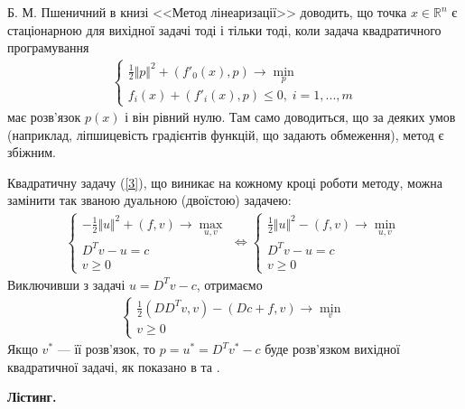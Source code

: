 \documentclass{extreport}
\begin{document}
Б. М. Пшеничний в книзі <<Метод лінеаризації>> \cite{1} доводить, що точка $x\in\mathbb{R}^n$ є стаціонарною для вихідної задачі тоді і тільки тоді, коли
задача квадратичного програмування
\begin{gather}
    \begin{cases}
        \frac{1}{2} \Vert p \Vert^2 + \left(f'_0(x), p\right) \to \underset{p}{\min} \\
        f_i(x) + \left(f'_i(x), p\right) \leq 0, \; i = 1, ..., m
    \end{cases}
\end{gather}
має розв'язок $p(x)$ і він рівний нулю. Там само доводиться, що за деяких умов (наприклад, ліпшицевість градієнтів функцій, що задають обмеження), метод є збіжним.

Квадратичну задачу (\ref{3}), що виникає на кожному кроці роботи методу, можна замінити так званою дуальною (двоїстою) задачею:
\begin{gather}
    \begin{cases}
        -\frac{1}{2} \Vert u \Vert^2 + \left(f, v\right) \to \underset{u, v}{\max} \\
        D^T v - u = c\\
        v \geq 0
    \end{cases} \Leftrightarrow
    \begin{cases}
        \frac{1}{2} \Vert u\Vert^2 - \left(f, v\right) \to \underset{u, v}{\min} \\
        D^T v - u = c \\
        v \geq 0
    \end{cases}
\end{gather}
Виключивши з задачі $u = D^T v - c$, отримаємо
\begin{gather}
    \begin{cases}
        \frac{1}{2}\left(D D^T v, v\right) - \left(D c + f, v \right) \to \underset{v}{\min} \\
        v \geq 0
    \end{cases}
\end{gather}
Якщо $v^*$ --- її розв'язок, то $p = u^* = D^T v^* - c$ буде розв'язком вихідної квадратичної задачі, як показано в \cite{1} та \cite{2}.

\noindent\textbf{Лістинг.}
\end{document}
